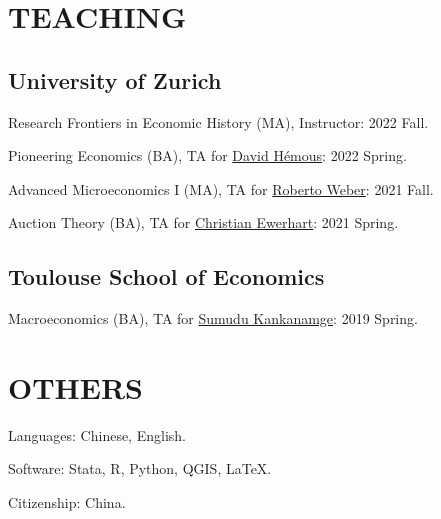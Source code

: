 \documentclass[letterpaper]{article}
\renewenvironment{itemize}{
  \begin{list}{}{
    \setlength{\leftmargin}{1.5em}
  }
}{
  \end{list}
}
\begin{document}

\section*{\MakeUppercase{teaching}}
\subsection*{University of Zurich}
\begin{itemize}
	\item Research Frontiers in Economic History (MA), Instructor: 2022 Fall.
    \item Pioneering Economics (BA), TA for \href{https://www.econ.uzh.ch/en/people/faculty/hemous.html}{David Hémous}: 2022 Spring.
    \item Advanced Microeconomics I (MA), TA for \href{https://www.econ.uzh.ch/en/people/faculty/weber.html}{Roberto Weber}: 2021 Fall.
    \item Auction Theory (BA), TA for \href{https://www.econ.uzh.ch/en/people/faculty/ewerhart.html}{Christian Ewerhart}: 2021 Spring.
\end{itemize}
\subsection*{Toulouse School of Economics}
\begin{itemize}
    \item Macroeconomics  (BA), TA for \href{https://www.tse-fr.eu/people/sumudu-kankanamge}{Sumudu Kankanamge}: 2019 Spring.
\end{itemize}

\section*{\MakeUppercase{Others}}
\begin{itemize}
    \item Languages: Chinese, English.
    \item Software: Stata, R, Python, QGIS, \LaTeX.
    \item Citizenship: China.
\end{itemize}
\bigskip

\end{document}
